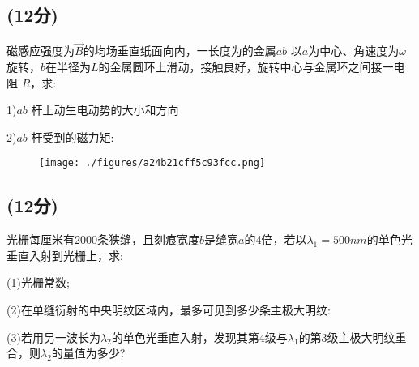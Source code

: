 \subsection{(12分)}
磁感应强度为$\vec{B}$的均场垂直纸面向内，一长度为的金属$ab$ 以$a$为中心、角速度为$\omega$旋转，$b$在半径为$L$的金属圆环上滑动，接触良好，旋转中心与金属环之间接一电阻 $R$，求:

1)$ab$ 杆上动生电动势的大小和方向

2)$ab$ 杆受到的磁力矩:
\begin{figure}[ht]
\centering
\texttt{[image: ./figures/a24b21cff5c93fcc.png]}
\caption{} \label{fig_NJU07_6}
\end{figure}
\subsection{(12分)}
光栅每厘米有2000条狭缝，且刻痕宽度$b$是缝宽$a$的4倍，若以$\lambda_1=500nm$的单色光垂直入射到光栅上，求:

(1)光栅常数;

(2)在单缝衍射的中央明纹区域内，最多可见到多少条主极大明纹:

(3)若用另一波长为$\lambda_2$的单色光垂直入射，发现其第4级与$\lambda_1$的第3级主极大明纹重合，则$\lambda_2$的量值为多少?
